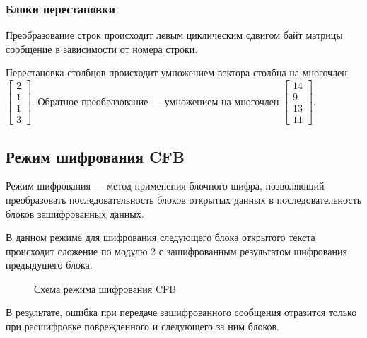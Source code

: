 \subsubsection{Блоки перестановки}

Преобразование строк происходит левым циклическим сдвигом байт матрицы
сообщение в зависимости от номера строки.

Перестановка столбцов происходит умножением вектора-столбца на многочлен
$\begin{bmatrix} 2 \\ 1 \\ 1 \\ 3 \end{bmatrix}$. Обратное преобразование ---
умножением на многочлен $\begin{bmatrix} 14 \\ 9 \\ 13 \\ 11 \end{bmatrix}$.

\subsection{Режим шифрования CFB}
Режим шифрования --- метод применения блочного шифра, позволяющий преобразовать
последовательность блоков открытых данных в последовательность блоков
зашифрованных данных.

В данном режиме для шифрования следующего блока открытого текста происходит
сложение по модулю 2 с зашифрованным результатом шифрования предыдущего блока.

\begin{figure}[h]
    \centering
    \def\svgwidth{\textwidth}
    
    \caption{Схема режима шифрования CFB}
    \label{fig:pcbc}
\end{figure}

В результате, ошибка при передаче зашифрованного сообщения отразится только
при расшифровке поврежденного и следующего за ним блоков.

